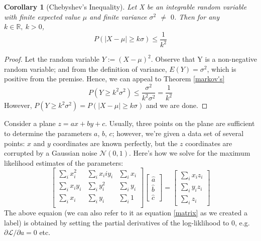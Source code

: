 \documentclass[10pt]{article}
\newtheorem{corollary}[theorem]{Corollary}
\theoremstyle{remark}
\begin{document}
\begin{corollary}[Chebyshev's Inequality]
\label{chebyshev's}
Let X be an integrable random variable with finite expected value $\mu$ and finite variance $\sigma^2$ $\ne$ $0$. Then for any $k \in \mathbb{R},~ k > 0$,  
\begin{equation*}
P(|X - \mu| \geq k\sigma) \leq \frac{1}{k^2}
\end{equation*}

\end{corollary}
\begin{proof}
Let the random variable $Y := (X - \mu)^2$. Observe that Y is a non-negative random variable; and from the definition of variance, $E(Y) = \sigma^2$, which is positive from the premise. Hence, we can appeal to Theorem \ref{markov's}
\begin{equation*}
P(Y \geq k^2\sigma^2) \leq \frac{\sigma^2}{k^2\sigma^2} = \frac{1}{k^2}
\end{equation*}
However, $P(Y \geq k^2\sigma^2) = P(|X - \mu| \geq k\sigma)$ and we are done.
\end{proof} 
Consider a plane $z = ax + by +c$. Usually, three points on the plane are sufficient to determine the parameters  $a$, $b$, $c$; however, we're given a data set of several points: $x$ and $y$ coordinates are known perfectly, but the $z$ coordinates are corrupted by a Gaussian noise $\mathcal{N}(0,1)$. Here's how we solve for the maximum likelihood estimates of the parameters:
\begin{equation}\label{matrix}
\begin{bmatrix}
		\sum_{i}x_{i}^2	 &  \sum_{i}x_{i}{i}y_{i}   &  \sum_{i}x_{i} \\
		\sum_{i}x_{i}y_{i}	 &  \sum_{i}y_{i}^2   &  \sum_{i}y_{i}  \\
		\sum_{i}x_{i}	&   \sum_{i}y_{i}   &  \sum_{i}1   \\ 
\end{bmatrix}
\begin{bmatrix}
	\hat{a}  \\  \hat{b}  \\ \hat{c}
\end{bmatrix} = 
\begin{bmatrix}
	\sum_{i}x_{i}z_{i}  \\ \sum_{i}y_{i}z_{i}	\\ \sum_{i}z_{i}
\end{bmatrix}
\end{equation}
The above equaion (we can also refer to it as equation \ref{matrix} as we created a label) is obtained by setting the partial derivatives of the log-liklihood to 0, e.g. $\partial \mathcal{L}/\partial a = 0$ etc.
\end{document}
